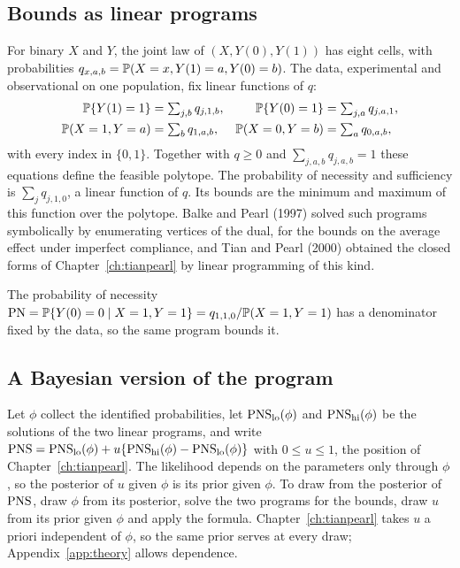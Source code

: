 \subsection{Bounds as linear programs}

For binary $X$ and $Y$, the joint law of $(X, Y(0), Y(1))$ has eight cells, with probabilities $q_{x,a,b} = \mathbb{P}(X = x, Y(1) = a, Y(0) = b)$. The data, experimental and observational on one population, fix linear functions of $q$:
\begin{align*}
\mathbb{P}\{Y(1) = 1\} &= \textstyle\sum_{j, b} q_{j, 1, b}, & \mathbb{P}\{Y(0) = 1\} &= \textstyle\sum_{j, a} q_{j, a, 1}, \\
\mathbb{P}(X = 1, Y = a) &= \textstyle\sum_b q_{1, a, b}, & \mathbb{P}(X = 0, Y = b) &= \textstyle\sum_a q_{0, a, b},
\end{align*}
with every index in $\{0, 1\}$. Together with $q \geq 0$ and $\sum_{j,a,b} q_{j,a,b} = 1$ these equations define the feasible polytope. The probability of necessity and sufficiency is $\sum_j q_{j,1,0}$, a linear function of $q$. Its bounds are the minimum and maximum of this function over the polytope. Balke and Pearl (1997) solved such programs symbolically by enumerating vertices of the dual, for the bounds on the average effect under imperfect compliance, and Tian and Pearl (2000) obtained the closed forms of Chapter~\ref{ch:tianpearl} by linear programming of this kind. 

The probability of necessity $\mathrm{PN} = \mathbb{P}\{Y(0) = 0 \mid X = 1, Y = 1\} = q_{1,1,0}/\mathbb{P}(X = 1, Y = 1)$ has a denominator fixed by the data, so the same program bounds it.

\subsection{A Bayesian version of the program}

 Let $\phi$ collect the identified probabilities, let $\mathrm{PNS}_{\mathrm{lo}}(\phi)$ and $\mathrm{PNS}_{\mathrm{hi}}(\phi)$ be the solutions of the two linear programs, and write $\mathrm{PNS} = \mathrm{PNS}_{\mathrm{lo}}(\phi) + u\{\mathrm{PNS}_{\mathrm{hi}}(\phi) - \mathrm{PNS}_{\mathrm{lo}}(\phi)\}$ with $0 \le u \le 1$, the position of Chapter~\ref{ch:tianpearl}. The likelihood depends on the parameters only through $\phi$, so the posterior of $u$ given $\phi$ is its prior given $\phi$. To draw from the posterior of $\mathrm{PNS}$, draw $\phi$ from its posterior, solve the two programs for the bounds, draw $u$ from its prior given $\phi$ and apply the formula. Chapter~\ref{ch:tianpearl} takes $u$ a priori independent of $\phi$, so the same prior serves at every draw; Appendix~\ref{app:theory} allows dependence.



